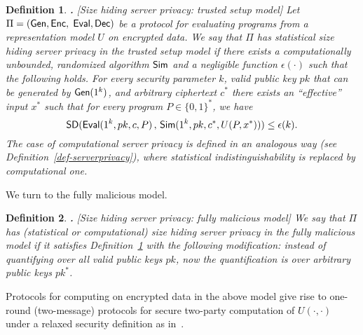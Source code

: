 \documentclass[11pt]{article}
\newcommand{\SD}{{\sf SD }}
\renewcommand{\sim}{{\sf Sim}}
\newcommand{\fnrngdom}[2]{#1\to#2}
\newcommand{\fndef}[3]{{#1\,:\,\fnrngdom{#2}{#3}}}
\newcommand{\set}[1]{\left\{#1\right\}}
\newtheorem{DEFINITION}{Definition}[section]
\newenvironment{definition}{\begin{DEFINITION} \hspace{-.85em} {\bf .} \rm}%
	{\end{DEFINITION}}
\newcommand{\bools}[1][]{{\set{0,1}}^{#1}}
\newcommand{\gen}{{\sf Gen}}
\newcommand{\enc}{{\sf Enc}}
\newcommand{\eval}{{\sf Eval}}
\newcommand{\dec}{{\sf Dec}}
\newcommand{\eps}{{\epsilon}}
\begin{document}
\begin{definition}[Size hiding server privacy: trusted setup model]
\label{def-trustedsetup} Let $\Pi=(\gen,\enc,$ $\eval,\dec)$ be a
protocol for evaluating programs from a representation model
$U$ on encrypted data. We say that $\Pi$ has {\em statistical size
hiding server privacy in the trusted setup model} if there exists a
computationally unbounded, randomized algorithm $\sim$ and a
negligible function $\eps(\cdot)$ such that the following holds.
For every security parameter $k$, valid public key $pk$ that can be
generated by $\gen(1^k)$, and arbitrary ciphertext $c^*$ there
exists an ``effective'' input $x^*$ such that for every program
$P\in\{0,1\}^*$, we have
\[ \SD(\eval(1^k,pk,c,P)\,,\,\sim(1^k,
pk, c^*, U(P,x^*))) \le \epsilon(k). \]
The case of {\em  computational} server privacy is defined in an
analogous way (see Definition~\ref{def-serverprivacy}),
where statistical indistinguishability is
replaced by computational one.
\end{definition}
We turn to the fully malicious model.
\begin{definition}[Size hiding server privacy: fully malicious model]
\label{def-fullymalicious} We say that $\Pi$ has (statistical or
computational) {\em size hiding server privacy in the fully
malicious model} if it satisfies Definition~\ref{def-trustedsetup}
with the following modification: instead of quantifying over all
{\em valid} public keys $pk$, now the quantification is over
arbitrary public keys $pk^*$.
\end{definition}

Protocols for computing on encrypted data in the above model give
rise to one-round (two-message) protocols for secure two-party
computation of $U(\cdot,\cdot)$ under a relaxed security definition
as in~\cite{NP01,AIR01,FIPR05}.

\end{document}
